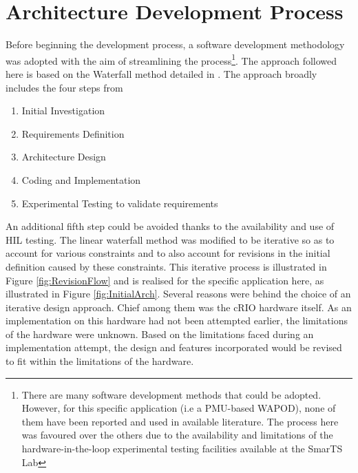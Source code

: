 \documentclass[conference]{IEEEtran}
\begin{document}
\section{Architecture Development Process}\label{arch}

Before beginning the development process, a software development methodology was adopted with the aim of streamlining the process\footnote{There are many software development methods that could be adopted. However, for this specific application (i.e a PMU-based WAPOD), none of them have been reported and used in available literature. The process here was favoured over the others due to the availability and limitations of the hardware-in-the-loop experimental testing facilities available at the SmarTS Lab\cite{SmarTSLab}}. The approach followed here is based on the Waterfall method detailed in \cite{WaterfallCoding}. The approach broadly includes the four steps from \cite{WaterfallCoding} 

\begin{enumerate}
\item Initial Investigation
\item Requirements Definition
\item Architecture Design
\item Coding and Implementation
\item Experimental Testing to validate requirements
\end{enumerate}

An additional fifth step could be avoided thanks to the availability and use of HIL testing. The linear waterfall method was modified to be iterative so as to account for various constraints and to also account for revisions in the initial definition caused by these constraints. This iterative process is illustrated in Figure \ref{fig:RevisionFlow} and is realised for the specific application here, as illustrated in Figure \ref{fig:InitialArch}. Several reasons were behind the choice of an iterative design approach. Chief among them was the cRIO hardware itself. As an implementation on this hardware had not been attempted earlier, the limitations of the hardware were unknown. Based on the limitations faced during an implementation attempt, the design and features incorporated would be revised to fit within the limitations of the hardware. 
\end{document}
